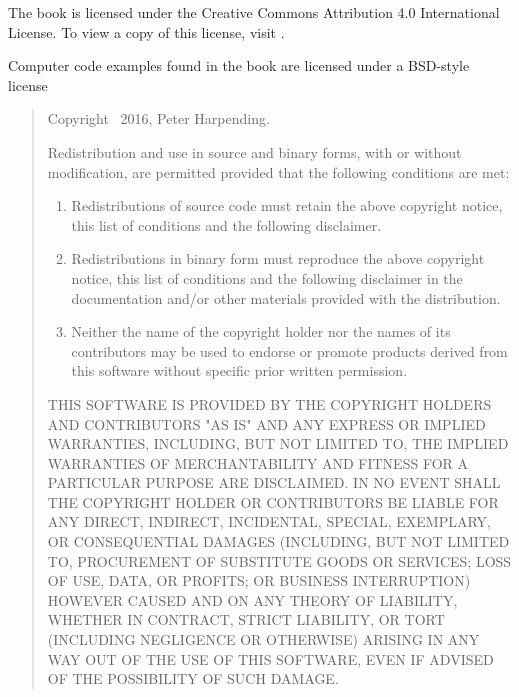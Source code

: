 \newpage

The book is licensed under the Creative Commons Attribution 4.0
International License. To view a copy of this license, visit
.

Computer code examples found in the book are licensed under a
BSD-style license

\noindent\hrulefill

\begin{quote}
  { \footnotesize Copyright \textcopyright\ 2016, Peter Harpending.

    Redistribution and use in source and binary forms, with or without
    modification, are permitted provided that the following conditions
    are met:

    \begin{enumerate}
    \item Redistributions of source code must retain the above
      copyright notice, this list of conditions and the following
      disclaimer.

    \item Redistributions in binary form must reproduce the above
      copyright notice, this list of conditions and the following
      disclaimer in the documentation and/or other materials provided
      with the distribution.

    \item Neither the name of the copyright holder nor the names of
      its contributors may be used to endorse or promote products
      derived from this software without specific prior written
      permission.
    \end{enumerate}

    THIS SOFTWARE IS PROVIDED BY THE COPYRIGHT HOLDERS AND
    CONTRIBUTORS "AS IS" AND ANY EXPRESS OR IMPLIED WARRANTIES,
    INCLUDING, BUT NOT LIMITED TO, THE IMPLIED WARRANTIES OF
    MERCHANTABILITY AND FITNESS FOR A PARTICULAR PURPOSE ARE
    DISCLAIMED. IN NO EVENT SHALL THE COPYRIGHT HOLDER OR CONTRIBUTORS
    BE LIABLE FOR ANY DIRECT, INDIRECT, INCIDENTAL, SPECIAL,
    EXEMPLARY, OR CONSEQUENTIAL DAMAGES (INCLUDING, BUT NOT LIMITED
    TO, PROCUREMENT OF SUBSTITUTE GOODS OR SERVICES; LOSS OF USE,
    DATA, OR PROFITS; OR BUSINESS INTERRUPTION) HOWEVER CAUSED AND ON
    ANY THEORY OF LIABILITY, WHETHER IN CONTRACT, STRICT LIABILITY, OR
    TORT (INCLUDING NEGLIGENCE OR OTHERWISE) ARISING IN ANY WAY OUT OF
    THE USE OF THIS SOFTWARE, EVEN IF ADVISED OF THE POSSIBILITY OF
    SUCH DAMAGE.  }
\end{quote}

